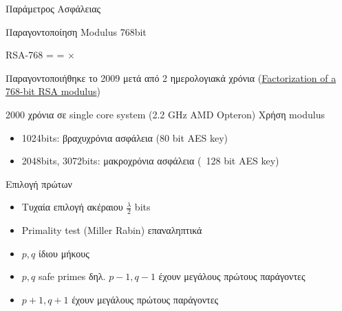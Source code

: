 \documentclass[handout]{beamer}
\begin{document}
\begin{frame}{Παράμετρος Ασφάλειας}
\begin{block}{Παραγοντοποίηση Modulus 768bit}
\begin{tiny}

RSA-768 = \alert{ }=
$\times$
\end{tiny}
\end{block}
Παραγοντοποιήθηκε το 2009 μετά από 2 ημερολογιακά χρόνια (\href{http://eprint.iacr.org/2010/006}{Factorization of a 768-bit RSA modulus})

2000 χρόνια σε single core system (2.2 GHz AMD Opteron)
\pause 
Χρήση modulus
\begin{itemize}

\item 1024bits: βραχυχρόνια ασφάλεια (80 bit AES key)
\item 2048bits, 3072bits: μακροχρόνια ασφάλεια (~128 bit AES key)
\end{itemize}
\end{frame}

\begin{frame}{Επιλογή πρώτων}
\begin{itemize}
\item Τυχαία επιλογή ακέραιου $\frac{\lambda}{2}$ bits
\pause
\item Primality test (Miller Rabin) επαναληπτικά
\pause
\item $p, q$ ίδιου μήκους
\item $p,q$ safe primes δηλ. $p-1,q-1$ έχουν μεγάλους πρώτους παράγοντες
\item $p+1,q+1$ έχουν μεγάλους πρώτους παράγοντες
\end{itemize}
\end{frame}
\end{document}
